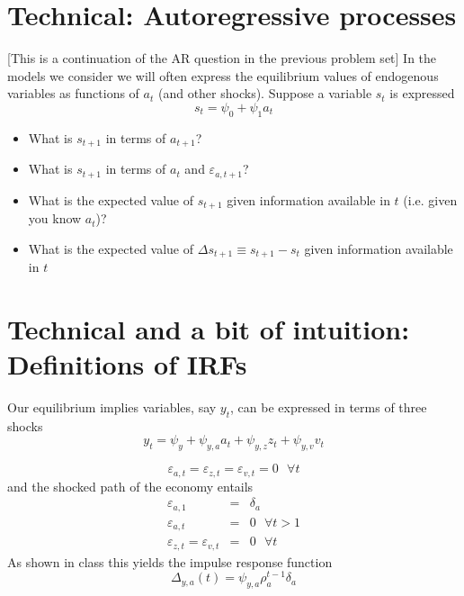 \documentclass[authoryear,11pt]{elsarticle}
\begin{document}
\section{Technical: Autoregressive processes}
[This is a continuation of the AR question in the previous problem set] In the models we consider we will often express the equilibrium values of endogenous variables as functions of $a_{t}$ (and other shocks). Suppose a variable $s_{t}$ is expressed
\[
s_{t} = \psi_{0} + \psi_{1} a_{t}
\]
\begin{itemize}
\item	What is $s_{t+1}$ in terms of $a_{t+1}$?
\item	What is $s_{t+1}$ in terms of $a_{t}$ and $\varepsilon_{a,t+1}$?
\item	What is the expected value of $s_{t+1}$ given information available in $t$ (i.e. given you know $a_{t}$)?
\item	What is the expected value of $\Delta s_{t+1} \equiv s_{t+1} - s_{t}$ given information available in $t$
\end{itemize}

\section{Technical and a bit of intuition: Definitions of IRFs}
Our equilibrium implies variables, say $y_{t}$, can be expressed in terms of three shocks
\[
y_{t} = \psi_{y} + \psi_{y,a} a_{t} + \psi_{y,z} z_{t} + \psi_{y,v} v_{t}
\]

\[
\varepsilon_{a,t}=\varepsilon_{z,t}=\varepsilon_{v,t}=0 \text{  }\forall t
\]
and the shocked path of the economy entails
\begin{eqnarray*}
\varepsilon_{a,1} &=& \delta_{a} \\
\varepsilon_{a,t} &=& 0 \text{  }\forall t>1 \\
\varepsilon_{z,t}=\varepsilon_{v,t}&=&0 \text{  }\forall t
\end{eqnarray*}
As shown in class this yields the impulse response function
\[
\Delta_{y,a}(t) = \psi_{y,a} \rho_a^{t-1} \delta_{a}
\]
\end{document}
